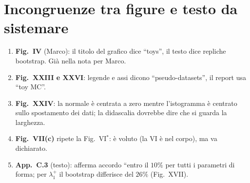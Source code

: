 \documentclass[10.5pt,a4paper]{article}
\begin{document}
\clearpage
\section*{Incongruenze tra figure e testo da sistemare}
\begin{enumerate}
\item \textbf{Fig.\ IV} (Marco): il titolo del grafico dice ``toys'', il testo dice repliche bootstrap. Già nella nota per Marco.
\item \textbf{Fig.\ XXIII e XXVI}: legende e assi dicono ``pseudo-datasets'', il report usa ``toy MC''.
\item \textbf{Fig.\ XXIV}: la normale è centrata a zero mentre l'istogramma è centrato sullo spostamento dei dati; la didascalia dovrebbe dire che si guarda la larghezza.
\item \textbf{Fig.\ VII(c)} ripete la Fig.\ VI$^{*}$: è voluto (la VI è nel corpo), ma va dichiarato.
\item \textbf{App.\ C.3} (testo): afferma accordo ``entro il $10\%$ per tutti i parametri di forma; per $\lambda_1^+$ il bootstrap differisce del $26\%$ (Fig.\ XVII).
\end{enumerate}
\end{document}
